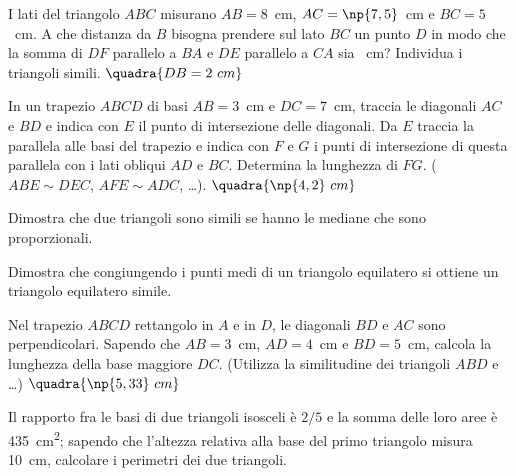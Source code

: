 \begin{multicols}{2}
\begin{esercizio}
\label{ese:6.79}
I lati del triangolo \(ABC\) misurano \(AB=8\)~cm, \(AC=\np{7,5}\)~cm e 
\(BC=5\)~cm. A che distanza da \(B\) bisogna prendere sul lato \(BC\) un 
punto \(D\) in modo che la somma di \(DF\) parallelo a \(BA\) e \(DE\) 
parallelo a \(CA\) sia ~cm? Individua i triangoli simili.
\hfill\(\quadra{DB=2~cm}\)
\end{esercizio}

\begin{esercizio}
\label{ese:6.81}
In un trapezio \(ABCD\) di basi \(AB=3\)~cm e \(DC=7\)~cm, traccia le 
diagonali \(AC\) e \(BD\) e indica con \(E\) il punto di intersezione delle 
diagonali. Da \(E\) traccia la parallela alle basi del trapezio e 
indica con \(F\) e \(G\) i punti di intersezione di questa parallela con i 
lati obliqui \(AD\) e \(BC\). Determina la lunghezza di \(FG\). (\(ABE\sim 
DEC\), \(AFE\sim ADC\), \ldots).
\hfill\(\quadra{\np{4,2}~cm}\)
\end{esercizio}

\begin{esercizio}
\label{ese:6.82}
Dimostra che due triangoli sono simili se hanno le mediane che sono 
proporzionali.
\end{esercizio}

\begin{esercizio}
\label{ese:6.83}
Dimostra che congiungendo i punti medi di un triangolo equilatero si 
ottiene un triangolo equilatero simile.
\end{esercizio}

\begin{esercizio}
\label{ese:6.84}
Nel trapezio \(ABCD\) rettangolo in \(A\) e in \(D\), le diagonali \(BD\) e 
\(AC\) sono perpendicolari. Sapendo che \(AB=3\)~cm, \(AD=4\)~cm e 
\(BD=5\)~cm, calcola la lunghezza della base maggiore \(DC\). (Utilizza 
la similitudine dei triangoli \(ABD\) e \ldots{})
\hfill\(\quadra{\np{5,33}~cm}\)
\end{esercizio}

\begin{esercizio}
\label{ese:6.85}
Il rapporto fra le basi di due triangoli isosceli è \(2/5\) e la somma 
delle loro aree è 435~cm\textsuperscript{2}; sapendo che l'altezza 
relativa alla base del primo triangolo misura 10~cm, calcolare i 
perimetri dei due triangoli. 
\end{esercizio}


\end{multicols}
